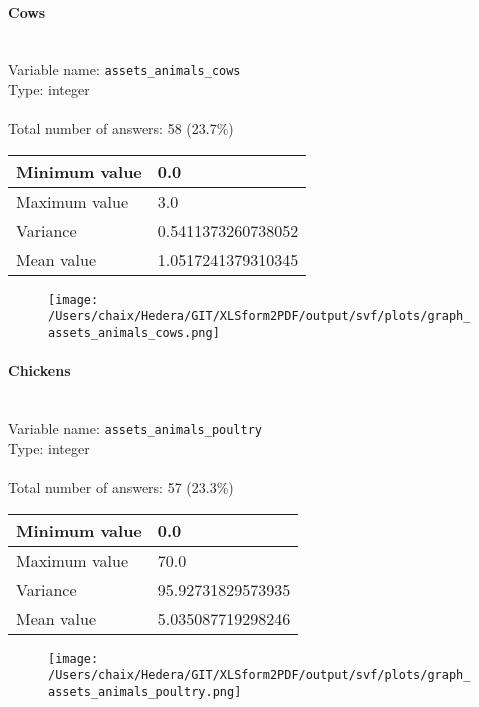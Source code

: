 \documentclass[11.5pt, a4paper]{scrartcl}
\begin{document}
\paragraph{Cows}
\  \\Variable name: \texttt{assets\_animals\_cows}\\
Type: integer\\
\\Total number of answers: 58 (23.7\%)
\\[0.2em] \begin{tabular}{p{4cm}|p{8cm}}
Minimum value &0.0 \\
\hline
\cellcolor{mygray} Maximum value & \cellcolor{mygray}3.0 \\
\hline
Variance &0.5411373260738052 \\
\hline
\cellcolor{mygray} Mean value & \cellcolor{mygray}1.0517241379310345 \\
\hline
\end{tabular}
\begin{figure}[H]
\centering
\texttt{[image: /Users/chaix/Hedera/GIT/XLSform2PDF/output/svf/plots/graph\_assets\_animals\_cows.png]}
\end{figure}
\paragraph{Chickens}
\  \\Variable name: \texttt{assets\_animals\_poultry}\\
Type: integer\\
\\Total number of answers: 57 (23.3\%)
\\[0.2em] \begin{tabular}{p{4cm}|p{8cm}}
Minimum value &0.0 \\
\hline
\cellcolor{mygray} Maximum value & \cellcolor{mygray}70.0 \\
\hline
Variance &95.92731829573935 \\
\hline
\cellcolor{mygray} Mean value & \cellcolor{mygray}5.035087719298246 \\
\hline
\end{tabular}
\begin{figure}[H]
\centering
\texttt{[image: /Users/chaix/Hedera/GIT/XLSform2PDF/output/svf/plots/graph\_assets\_animals\_poultry.png]}
\end{figure}
\end{document}
